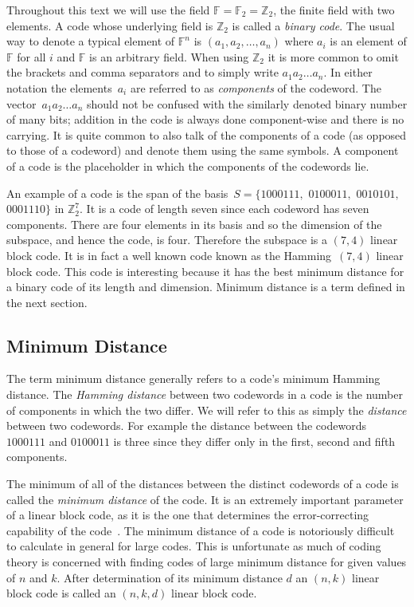 Throughout this text we will use the field $\mathbb{F} = \mathbb{F}_2 = \mathbb{Z}_2$, the finite field with two elements.
A code whose underlying field is $\mathbb{Z}_2$ is called a \emph{binary code}.
The usual way to denote a typical element of $\mathbb{F}^n$ is $(a_1,a_2,\ldots,a_n)$ where $a_i$ is an element of $\mathbb{F}$ for all $i$ and $\mathbb{F}$ is an arbitrary field.
When using $\mathbb{Z}_2$ it is more common to omit the brackets and comma separators and to simply write $a_1 a_2 \ldots a_n$.
In either notation the elements~$a_i$ are referred to as \emph{components} of the codeword.
The vector~$a_1 a_2 \ldots a_n$ should not be confused with the similarly denoted binary number of many bits; addition in the code is always done component-wise and there is no carrying.
It is quite common to also talk of the components of a code (as opposed to those of a codeword) and denote them using the same symbols.
A component of a code is the placeholder in which the components of the codewords lie.

An example of a code is the span of the basis~$S=\{1000111,$ $0100011,$ $0010101,$ $0001110\}$ in $\mathbb{Z}_2^7$.
It is a code of length seven since each codeword has seven components.
There are four elements in its basis and so the dimension of the subspace, and hence the code, is four.
Therefore the subspace is a $(7,4)$ linear block code.
It is in fact a well known code known as the Hamming~$(7,4)$ linear block code.
This code is interesting because it has the best minimum distance for a binary code of its length and dimension.
Minimum distance is a term defined in the next section.

\subsection{Minimum Distance}
The term minimum distance generally refers to a code's minimum Hamming distance.
The \emph{Hamming distance} between two codewords in a code is the number of components in which the two differ.
We will refer to this as simply the \emph{distance} between two codewords.
For example the distance between the codewords $1000111$ and $0100011$ is three since they differ only in the first, second and fifth components.

The minimum of all of the distances between the distinct codewords of a code is called the \emph{minimum distance} of the code.
It is an extremely important parameter of a linear block code, as it is the one that determines the error-correcting capability of the code~\cite[p.~8]{huf03}.
The minimum distance of a code is notoriously difficult to calculate in general for large codes.
This is unfortunate as much of coding theory is concerned with finding codes of large minimum distance for given values of $n$ and $k$.
After determination of its minimum distance $d$ an $(n,k)$ linear block code is called an $(n,k,d)$ linear block code.

